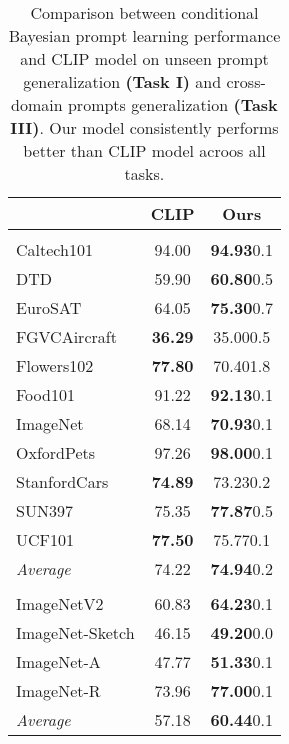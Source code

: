\documentclass[10pt,twocolumn,letterpaper]{article}
\begin{document}
\begin{table}[t]
\centering
\renewcommand\thetable{11}
\caption{Comparison between conditional Bayesian prompt learning performance and CLIP model on unseen prompt generalization \textbf{(Task I)} and cross-domain prompts generalization \textbf{(Task III)}. Our model consistently performs better than CLIP model acroos all tasks.}
\vspace{-2mm}
\begin{tabular}{lcc}
\midrule
 & 
\multicolumn{1}{c}{\centering \textbf{CLIP}} & \multicolumn{1}{c}{\centering \textbf{Ours}} \\
\midrule
\rowcolor{palegray}
\multicolumn{3}{c}{\centering \textbf{Task I}} \\
\midrule
Caltech101              & 94.00 & \textbf{94.93}\scriptsize{0.1}  \\
DTD                     & 59.90 & \textbf{60.80}\scriptsize{0.5}  \\
EuroSAT                 & 64.05 & \textbf{75.30}\scriptsize{0.7}  \\
FGVCAircraft            & \textbf{36.29} & 35.00\scriptsize{0.5}  \\
Flowers102              & \textbf{77.80} & 70.40\scriptsize{1.8}  \\
Food101                 & 91.22 & \textbf{92.13}\scriptsize{0.1}  \\
ImageNet                & 68.14 & \textbf{70.93}\scriptsize{0.1}  \\
OxfordPets              & 97.26 & \textbf{98.00}\scriptsize{0.1}  \\
StanfordCars            & \textbf{74.89} & 73.23\scriptsize{0.2}  \\
SUN397                  & 75.35 & \textbf{77.87}\scriptsize{0.5}  \\
UCF101                  & \textbf{77.50} & 75.77\scriptsize{0.1}  \\
\midrule
\textit{Average }       & 74.22 & \textbf{74.94}\scriptsize{0.2}  \\
\midrule
\midrule
\rowcolor{palegray}
\multicolumn{3}{c}{\centering \textbf{Task III}} \\
\midrule
ImageNetV2              & 60.83 & \textbf{64.23}\scriptsize{0.1}  \\
ImageNet-Sketch         & 46.15 & \textbf{49.20}\scriptsize{0.0}  \\
ImageNet-A              & 47.77 & \textbf{51.33}\scriptsize{0.1}  \\
ImageNet-R              & 73.96 & \textbf{77.00}\scriptsize{0.1}  \\
\midrule
\textit{Average }       & 57.18 & \textbf{60.44}\scriptsize{0.1}  \\
\bottomrule
\end{tabular}

\label{tab:fixed-prompt}
\end{table}
\end{document}

